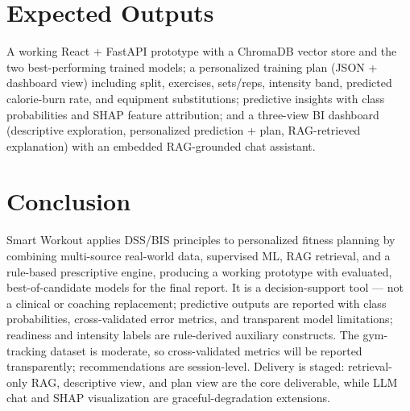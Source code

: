 \documentclass[10pt,a4paper]{article}
\begin{document}
\section{Expected Outputs}
A working React + FastAPI prototype with a ChromaDB vector store and the two best-performing trained models; a personalized training plan (JSON + dashboard view) including split, exercises, sets/reps, intensity band, predicted calorie-burn rate, and equipment substitutions; predictive insights with class probabilities and SHAP feature attribution; and a three-view BI dashboard (descriptive exploration, personalized prediction + plan, RAG-retrieved explanation) with an embedded RAG-grounded chat assistant.

\section{Conclusion}
Smart Workout applies DSS/BIS principles to personalized fitness planning by combining multi-source real-world data, supervised ML, RAG retrieval, and a rule-based prescriptive engine, producing a working prototype with evaluated, best-of-candidate models for the final report. It is a decision-support tool --- not a clinical or coaching replacement; predictive outputs are reported with class probabilities, cross-validated error metrics, and transparent model limitations; readiness and intensity labels are rule-derived auxiliary constructs. The gym-tracking dataset is moderate, so cross-validated metrics will be reported transparently; recommendations are session-level. Delivery is staged: retrieval-only RAG, descriptive view, and plan view are the core deliverable, while LLM chat and SHAP visualization are graceful-degradation extensions.
\end{document}
